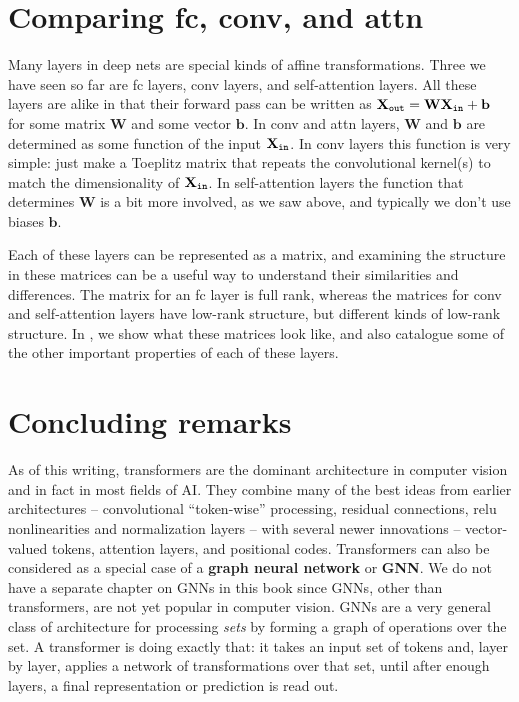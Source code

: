 \section{Comparing fc, conv, and attn}
Many layers in deep nets are special kinds of affine transformations. Three we have seen so far are fc layers, conv layers, and self-attention layers. All these layers are alike in that their forward pass can be written as $\mathbf{X}_{\texttt{out}} = \mathbf{W}\mathbf{X}_{\texttt{in}} + \mathbf{b}$ for some matrix $\mathbf{W}$ and some vector $\mathbf{b}$. In conv and attn layers, $\mathbf{W}$ and $\mathbf{b}$ are determined as some function of the input $\mathbf{X}_{\texttt{in}}$. In conv layers this function is very simple: just make a Toeplitz matrix that repeats the convolutional kernel(s) to match the dimensionality of $\mathbf{X}_{\texttt{in}}$. In self-attention layers the function that determines $\mathbf{W}$ is a bit more involved, as we saw above, and typically we don't use biases $\mathbf{b}$.

Each of these layers can be represented as a matrix, and examining the structure in these matrices can be a useful way to understand their similarities and differences. The matrix for an fc layer is full rank, whereas the matrices for conv and self-attention layers have low-rank structure, but different kinds of low-rank structure. In \fig{\ref{fig:transformers:affine_layer_comparison}}, we show what these matrices look like, and also catalogue some of the other important properties of each of these layers.


\section{Concluding remarks}
As of this writing, transformers are the dominant architecture in computer vision and in fact in most fields of AI. They combine many of the best ideas from earlier architectures -- convolutional ``token-wise'' processing, residual connections, relu nonlinearities and normalization layers -- with several newer innovations -- vector-valued tokens, attention layers, and positional codes. Transformers can also be considered as a special case of a \textbf{graph neural network} or \textbf{GNN}. We do not have a separate chapter on GNNs in this book since GNNs, other than transformers, are not yet popular in computer vision. GNNs are a very general class of architecture for processing \textit{sets} by forming a graph of operations over the set. A transformer is doing exactly that: it takes an input set of tokens and, layer by layer, applies a network of transformations over that set, until after enough layers, a final representation or prediction is read out.